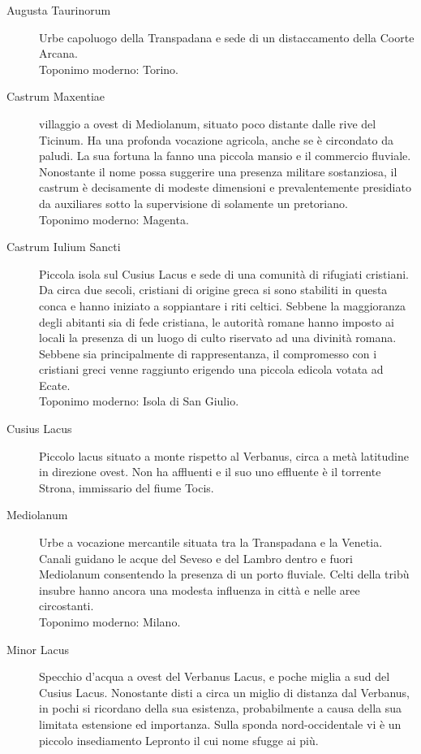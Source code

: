 \documentclass[11.5pt,twocolumn]{article}
\begin{document}
\begin{description}
\item[Augusta Taurinorum] Urbe capoluogo della Transpadana e sede di un distaccamento della Coorte Arcana.
\\Toponimo moderno: Torino.
\item[Castrum Maxentiae] villaggio a ovest di Mediolanum, situato poco distante dalle rive del Ticinum.
Ha una profonda vocazione agricola, anche se \`{e} circondato da paludi.
La sua fortuna la fanno una piccola mansio e il commercio fluviale.
Nonostante il nome possa suggerire una presenza militare sostanziosa, il castrum \`{e} decisamente di modeste dimensioni e prevalentemente presidiato da auxiliares sotto la supervisione di solamente un pretoriano.
\\Toponimo moderno: Magenta.
\item[Castrum Iulium Sancti] Piccola isola sul Cusius Lacus e sede di una comunit\`{a} di rifugiati cristiani.
Da circa due secoli, cristiani di origine greca si sono stabiliti in questa conca e hanno iniziato a soppiantare i riti celtici.
Sebbene la maggioranza degli abitanti sia di fede cristiana, le autorit\`{a} romane hanno imposto ai locali la presenza di un luogo di culto riservato ad una divinit\`{a} romana.
Sebbene sia principalmente di rappresentanza, il compromesso con i cristiani greci venne raggiunto erigendo una piccola edicola votata ad Ecate.
\\Toponimo moderno: Isola di San Giulio.
\item[Cusius Lacus] Piccolo lacus situato a monte rispetto al Verbanus, circa a met\`{a} latitudine in direzione ovest.
Non ha affluenti e il suo uno effluente \`{e} il torrente Strona, immissario del fiume Tocis.
\item[Mediolanum] Urbe a vocazione mercantile situata tra la Transpadana e la Venetia.
Canali guidano le acque del Seveso e del Lambro dentro e fuori Mediolanum consentendo la presenza di un porto fluviale.
Celti della trib\`{u} insubre hanno ancora una modesta influenza in citt\`{a} e nelle aree circostanti.
\\Toponimo moderno: Milano.
\item[Minor Lacus] Specchio d'acqua a ovest del Verbanus Lacus, e poche miglia a sud del Cusius Lacus.
Nonostante disti a circa un miglio di distanza dal Verbanus, in pochi si ricordano della sua esistenza, probabilmente a causa della sua limitata estensione ed importanza.
Sulla sponda nord-occidentale vi \`{e} un piccolo insediamento Lepronto il cui nome sfugge ai pi\`{u}.

\end{description}
\end{document}
